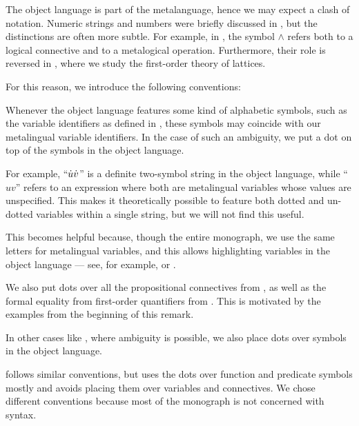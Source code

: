 \begin{remark}\label{rem:object_language_dots}
  The object language is part of the metalanguage, hence we may expect a clash of notation. Numeric strings and numbers were briefly discussed in , but the distinctions are often more subtle. For example, in , the symbol \( \wedge \) refers both to a logical connective and to a metalogical operation. Furthermore, their role is reversed in , where we study the first-order theory of lattices.

  For this reason, we introduce the following conventions:
  \begin{thmenum}
     Whenever the object language features some kind of alphabetic symbols, such as the variable identifiers as defined in , these symbols may coincide with our metalingual variable identifiers. In the case of such an ambiguity, we put a dot on top of the symbols in the object language.

    For example, \enquote{\( \dot{u} \dot{v} \)} is a definite two-symbol string in the object language, while \enquote{\( uv \)} refers to an expression where both are metalingual variables whose values are unspecified. This makes it theoretically possible to feature both dotted and un-dotted variables within a single string, but we will not find this useful.

    This becomes helpful because, though the entire monograph, we use the same letters for metalingual variables, and this allows highlighting variables in the object language --- see, for example,  or .

     We also put dots over all the propositional connectives from , as well as the formal equality from first-order quantifiers from . This is motivated by the examples from the beginning of this remark.

     In other cases like , where ambiguity is possible, we also place dots over symbols in the object language.
  \end{thmenum}

   follows similar conventions, but uses the dots over function and predicate symbols mostly and avoids placing them over variables and connectives. We chose different conventions because most of the monograph is not concerned with syntax.
\end{remark}
